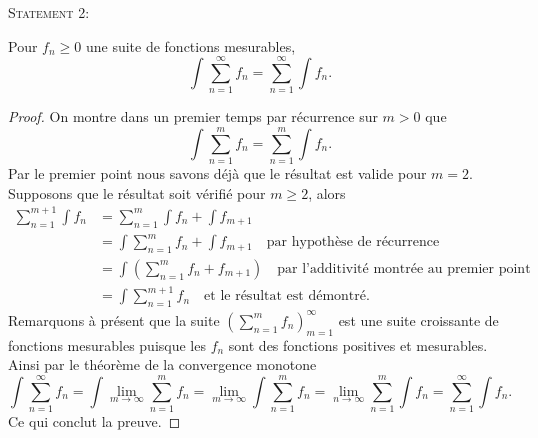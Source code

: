\documentclass[12pt]{article}
\newenvironment{statement}[1]
{\begin{mdframed}[linewidth=0.6pt]
        \textsc{Statement #1:}

}
    {\end{mdframed}}
\begin{document}
\begin{statement}{2}
	Pour $f_{n}\ge 0$ une suite de fonctions mesurables,
	\[
	\int \sum_{n=1}^{\infty} f_{n} = \sum_{n=1}^{\infty} \int f_n
	.\] 	
\end{statement}
\begin{proof}
	On montre dans un premier temps par récurrence sur $m > 0$ que \[
	\int \sum_{n=1}^{m} f_n = \sum_{n=1}^{m} \int f_n
	.\] 
	Par le premier point nous savons déjà que le résultat est valide pour $m = 2$.
	Supposons que le résultat soit vérifié pour $m \ge 2$, alors 
	 \begin{align*}
		 \sum_{n=1}^{m+1} \int f_{n} &= \sum_{n=1}^{m} \int f_{n} + \int f_{m+1} \\
					     &= \int \sum_{n=1}^{m} f_{n} + \int f_{m+1} \quad \text{par hypothèse de récurrence} \\
					     &= \int (\sum_{n=1}^{m} f_{n} + f_{m+1}) \quad \text{par l'additivité montrée au premier point} \\
					     &= \int \sum_{n=1}^{m+1} f_{n} \quad \text{et le résultat est démontré.}
	\end{align*} 
	Remarquons à présent que la suite $(\sum_{n=1}^{m} f_n)_{m=1}^{\infty}$ est une suite croissante de fonctions mesurables puisque les $f_{n}$ sont des fonctions positives et mesurables. Ainsi par le théorème de la convergence monotone \[
		\int \sum_{n=1}^{\infty} f_{n} = \int \lim_{m \rightarrow \infty} \sum_{n=1}^{m} f_{n} = \lim_{m \rightarrow \infty} \int \sum_{n=1}^{m} f_{n} = \lim_{n \rightarrow \infty} \sum_{n=1}^{m} \int f_{n} = \sum_{n=1}^{\infty} \int f_{n} 
.\]  Ce qui conclut la preuve.
\end{proof}
\end{document}
